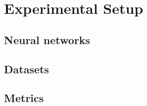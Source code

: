 \chapter{Experimental Setup}\label{chapter:experimental-setup}
\section{Neural networks}
\section{Datasets}
\section{Metrics}
